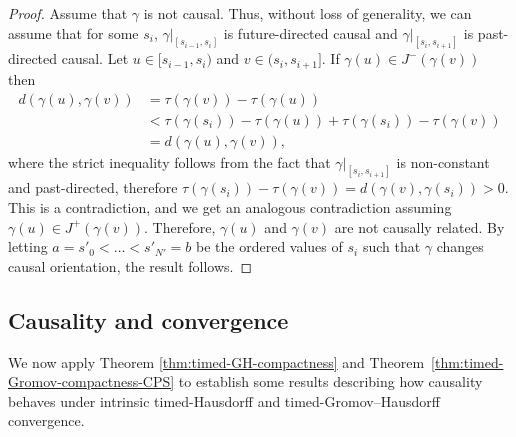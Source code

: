 \documentclass[a4paper,12pt,reqno]{amsart}
\theoremstyle{plain}
\begin{document}
\begin{proof}
Assume that $\gamma$ is not causal. Thus, without loss of generality, we can assume that for some $s_i$, $\gamma|_{[s_{i-1},s_i]}$ is future-directed causal and $\gamma|_{[s_i,s_{i+1}]}$ is past-directed causal. Let $u\in [s_{i-1},s_i)$ and $v\in (s_i,s_{i+1}]$. If $\gamma(u) \in J^-(\gamma(v))$ then 
\begin{align*}
d(\gamma(u),\gamma(v)) &= \tau(\gamma(v))-\tau(\gamma(u)) \\
&< \tau(\gamma(s_i))-\tau(\gamma(u))+\tau(\gamma(s_i))-\tau(\gamma(v)) \\
&= d(\gamma(u),\gamma(v)),
\end{align*}
where the strict inequality follows from the fact that $\gamma|_{[s_i,s_{i+1}]}$ is non-constant and past-directed, therefore $\tau(\gamma(s_i))-\tau(\gamma(v))=d(\gamma(v),\gamma(s_i))>0$. This is a contradiction, and we get an analogous contradiction assuming $\gamma(u)\in J^+(\gamma(v))$. Therefore, $\gamma(u)$ and $\gamma(v)$ are not causally related. By letting $a=s'_0<\dots<s'_{N'}=b$ be the ordered values of $s_i$ such that $\gamma$ changes causal orientation, the result follows.
\end{proof}
    





\subsection{Causality and convergence}


We now apply Theorem \ref{thm:timed-GH-compactness} and Theorem~\ref{thm:timed-Gromov-compactness-CPS}
to establish some results describing how causality behaves under intrinsic timed-Hausdorff and timed-Gromov--Hausdorff convergence.
\end{document}
